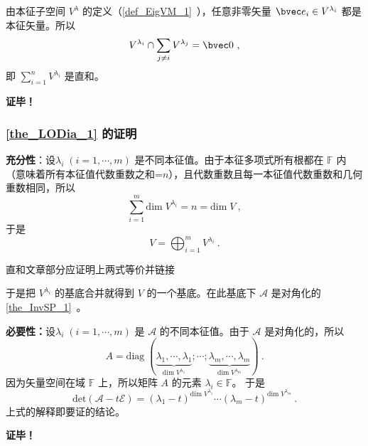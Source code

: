 由本征子空间 $V^\lambda$ 的定义（\autoref{def_EigVM_1}~），任意非零矢量 $\bvec e_i\in V^{\lambda _i}$ 都是本征矢量。所以
\begin{equation}
V^{\lambda_i}\cap\sum_{j\neq i}V^{\lambda_j}=\bvec 0~,
\end{equation}
即  $\sum\limits_{i=1}^nV^{\lambda_i}$ 是直和。

\textbf{证毕！}
\subsubsection{\autoref{the_LODia_1} 的证明}
\textbf{充分性}：设$\lambda_i\;(i=1,\cdots, m)$ 是不同本征值。由于本征多项式所有根都在 $\mathbb{F}$ 内（意味着所有本征值代数重数之和=$n$），且代数重数且每一本征值代数重数和几何重数相同，所以
\begin{equation}
\sum_{i=1}^m \mathrm{dim}\;V^{\lambda_i}=n=\mathrm{dim}\; V~,
\end{equation}
于是
\begin{equation}
V=\bigoplus_{i=1}^m V^{\lambda_i}~.
\end{equation}
\begin{issues}
直和文章部分应证明上两式等价并链接
\end{issues}
于是把 $V^{\lambda_i}$ 的基底合并就得到 $V$ 的一个基底。在此基底下 $\mathcal{A}$ 是对角化的\autoref{the_InvSP_1}~。

\textbf{必要性：}设$\lambda_i\;(i=1,\cdots, m)$ 是 $\mathcal A$ 的不同本征值。由于 $\mathcal A$ 是对角化的，所以
\begin{equation}
A=\mathrm{diag}\;(\underbrace{\lambda_1,\cdots,\lambda_1}_{\mathrm{dim}\;V^{\lambda_1}};\cdots;\underbrace{\lambda_m,\cdots,\lambda_m}_{\mathrm{dim}\;V^{\lambda_m}})~.
\end{equation}
因为矢量空间在域 $\mathbb{F}$ 上，所以矩阵 $A$ 的元素 $\lambda_i\in \mathbb{F}$。
于是
\begin{equation}
\mathrm{det}(\mathcal{A}-t\mathcal E)=(\lambda_1-t)^{\mathrm{dim}\;V^{\lambda_1}}\cdots(\lambda_m-t)^{\mathrm{dim}\;V^{\lambda_m}}~.
\end{equation}
上式的解释即要证的结论。

\textbf{证毕！}
